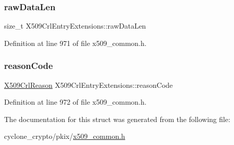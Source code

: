\subsubsection{\texorpdfstring{raw\+Data\+Len}{rawDataLen}}
{\footnotesize\ttfamily size\+\_\+t X509\+Crl\+Entry\+Extensions\+::raw\+Data\+Len}



Definition at line 971 of file x509\+\_\+common.\+h.

\mbox{\label{structX509CrlEntryExtensions_abf5c1417352a318774053023e5ba2349}} 
\subsubsection{\texorpdfstring{reason\+Code}{reasonCode}}
{\footnotesize\ttfamily \hyperlink{structX509CrlReason}{X509\+Crl\+Reason} X509\+Crl\+Entry\+Extensions\+::reason\+Code}



Definition at line 972 of file x509\+\_\+common.\+h.



The documentation for this struct was generated from the following file\+:\begin{DoxyCompactItemize}
\item 
cyclone\+\_\+crypto/pkix/\hyperlink{pkix_2x509__common_8h}{x509\+\_\+common.\+h}\end{DoxyCompactItemize}
